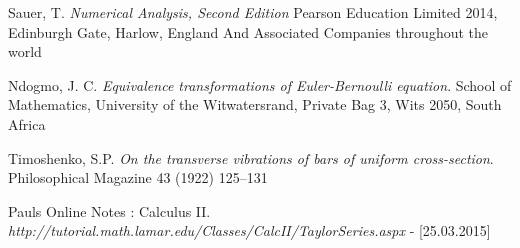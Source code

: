 \begin{thebibliography}{}
  Sauer, T. 
  \emph{Numerical Analysis, Second Edition}
  Pearson Education Limited 2014, Edinburgh Gate, Harlow, England And Associated Companies throughout the world
  
  Ndogmo, J. C. 
  \emph{Equivalence transformations of Euler-Bernoulli equation}.
  School of Mathematics, University of the Witwatersrand, Private Bag 3, Wits 2050, South
Africa

  Timoshenko, S.P. 
  \emph{On the transverse vibrations of bars of uniform cross-section}.
  Philosophical Magazine 43 (1922) 125–131
  
   Pauls Online Notes : Calculus II. 
    \emph{http://tutorial.math.lamar.edu/Classes/CalcII/TaylorSeries.aspx} - [25.03.2015]

\end{thebibliography}